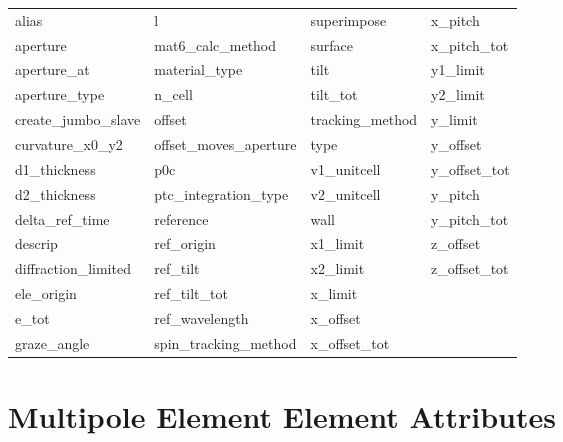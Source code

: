  \begin{tabular}{llll} \toprule
alias                       & l                           & superimpose                 & x_pitch                     \\
aperture                    & mat6_calc_method            & surface                     & x_pitch_tot                 \\
aperture_at                 & material_type               & tilt                        & y1_limit                    \\
aperture_type               & n_cell                      & tilt_tot                    & y2_limit                    \\
create_jumbo_slave          & offset                      & tracking_method             & y_limit                     \\
curvature_x0_y2             & offset_moves_aperture       & type                        & y_offset                    \\
d1_thickness                & p0c                         & v1_unitcell                 & y_offset_tot                \\
d2_thickness                & ptc_integration_type        & v2_unitcell                 & y_pitch                     \\
delta_ref_time              & reference                   & wall                        & y_pitch_tot                 \\
descrip                     & ref_origin                  & x1_limit                    & z_offset                    \\
diffraction_limited         & ref_tilt                    & x2_limit                    & z_offset_tot                \\
ele_origin                  & ref_tilt_tot                & x_limit                     &                             \\
e_tot                       & ref_wavelength              & x_offset                    &                             \\
graze_angle                 & spin_tracking_method        & x_offset_tot                &                             \\
 \bottomrule
 \end{tabular}
 \vfill
 
 \section{Multipole Element Element Attributes}
 \label{s:list.multipole}
 
